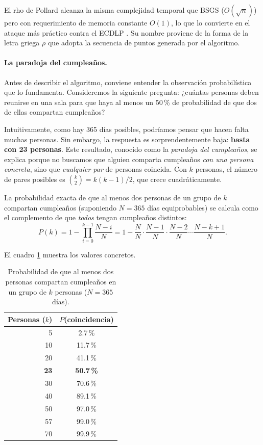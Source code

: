 El rho de Pollard \cite{pollard1978monte} alcanza la misma complejidad temporal que BSGS ($O(\sqrt{n})$) pero con requerimiento de memoria constante $O(1)$, lo que lo convierte en el ataque más práctico contra el ECDLP \cite{hankerson2004guide}. Su nombre proviene de la forma de la letra griega $\rho$ que adopta la secuencia de puntos generada por el algoritmo.


\paragraph{La paradoja del cumpleaños.}
Antes de describir el algoritmo, conviene entender la observación probabilística que lo fundamenta. Consideremos la siguiente pregunta: ¿cuántas personas deben reunirse en una sala para que haya al menos un 50\,\% de probabilidad de que dos de ellas compartan cumpleaños?

Intuitivamente, como hay 365 días posibles, podríamos pensar que hacen falta muchas personas. Sin embargo, la respuesta es sorprendentemente baja: \textbf{basta con 23 personas}. Este resultado, conocido como la \emph{paradoja del cumpleaños}, se explica porque no buscamos que alguien comparta cumpleaños \emph{con una persona concreta}, sino que \emph{cualquier par} de personas coincida. Con $k$ personas, el número de pares posibles es $\binom{k}{2} = k(k-1)/2$, que crece cuadráticamente.

La probabilidad exacta de que al menos dos personas de un grupo de $k$ compartan cumpleaños (suponiendo $N = 365$ días equiprobables) se calcula como el complemento de que \emph{todos} tengan cumpleaños distintos:
\[
    P(k) = 1 - \prod_{i=0}^{k-1} \frac{N - i}{N}
         = 1 - \frac{N}{N} \cdot \frac{N-1}{N} \cdot \frac{N-2}{N} \cdots \frac{N-k+1}{N}.
\]

El cuadro \ref{tab:birthday} muestra los valores concretos.

\begin{table}[htbp]
\centering
\begin{tabular}{rc}
\hline
\textbf{Personas ($k$)} & \textbf{$P$(coincidencia)} \\
\hline
5   & 2.7\,\% \\
10  & 11.7\,\% \\
20  & 41.1\,\% \\
\textbf{23} & \textbf{50.7\,\%} \\
30  & 70.6\,\% \\
40  & 89.1\,\% \\
50  & 97.0\,\% \\
57  & 99.0\,\% \\
70  & 99.9\,\% \\
\hline
\end{tabular}
\caption{Probabilidad de que al menos dos personas compartan cumpleaños en un grupo de $k$ personas ($N = 365$ días).}
\label{tab:birthday}
\end{table}

